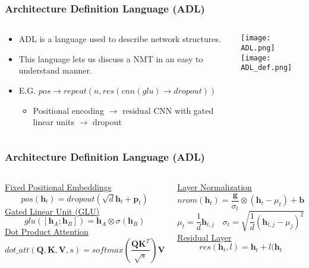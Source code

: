 \begin{frame}
\frametitle{Architecture Definition Language (ADL)}
    \begin{columns}
        \begin{column}{0.55\paperwidth}
        \begin{itemize}
            \item ADL is a language used to describe network structures.
            \item This language lets us discuss a NMT in an easy to understand manner.
            \item E.G. $pos \rightarrow repeat(n,res(cnn(glu) \rightarrow dropout))$ 
            \begin{itemize}
                \item Positional encoding $\rightarrow$ residual CNN with gated linear
                units $\rightarrow$ dropout
            \end{itemize}
        \end{itemize}
    \end{column}
        \begin{column}{0.39\paperwidth}
            \vspace{-1cm}
            \texttt{[image: ADL.png]}\\
            \texttt{[image: ADL\_def.png]}
        \end{column}
\end{columns}
\end{frame}

\begin{frame}
    \frametitle{Architecture Definition Language (ADL)}
    \begin{columns}
        \begin{column}{0.49\paperwidth}
            \underline{Fixed Positional Embeddings}
            \[
                pos(\textbf{h}_t) = dropout(\sqrt{d}\textbf{h}_t+\textbf{p}_t)
            \]
            \underline{Gated Linear Unit (GLU)}
            \[
                glu([\textbf{h}_A;\textbf{h}_B]) =
                \textbf{h}_A\otimes\sigma(\textbf{h}_B)
            \]
            \underline{Dot Product Attention}
            \[
                dot\_att(\textbf{Q},\textbf{K},\textbf{V},s)=
                softmax(\frac{\textbf{QK}^T}{\sqrt{s}})\textbf{V}
            \]
        \end{column}
        \begin{column}{0.49\paperwidth}
            \underline{Layer Normalization}
            \[
                nrom(\textbf{h}_t) = \frac{\textbf{g}}{\sigma_t}\otimes
                (\textbf{h}_t - \mu_t) + \textbf{b}
            \]
            \[
                \mu_t = \frac1d\textbf{h}_{t,j}   
                \hspace{1em}
                \sigma_t = \sqrt{\frac1d(\textbf{h}_{t,j} - \mu_j)^2}
            \]
            \underline{Residual Layer}
            \[
                res(\textbf{h}_t,l) = \textbf{h}_t + l(\textbf{h}_t
            \]
        \end{column}
    \end{columns}
\end{frame}

